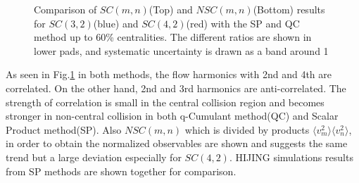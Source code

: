 \begin{figure}[bp]
\begin{center}
        \caption{Comparison of $SC(m,n)$(Top) and $NSC(m,n)$(Bottom) results for $SC(3,2)$(blue) and $SC(4,2)$(red) with the SP and QC method up to 60\% centralities. The different ratios are shown in lower pads, and systematic uncertainty is drawn as a band around 1}
        \label{SC_compare}
        \end{center}   
     \end{figure}


As seen in Fig.\ref{SC_compare} in both methods, the flow harmonics with 2nd and 4th are correlated. On the other hand, 2nd and 3rd harmonics are anti-correlated. The strength of correlation is small in the central collision region and becomes stronger in non-central collision in both q-Cumulant method(QC) and Scalar Product method(SP). Also  $NSC(m,n)$ which is divided by products $\langle v_m^2 \rangle \langle  v_n^2\rangle$, in order to obtain the normalized observables are shown and suggests the same trend but a large deviation especially for $SC(4,2)$. HIJING simulations results from SP methods are shown together for comparison. 

